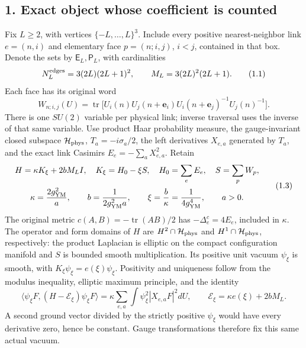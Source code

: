 \documentclass[
  11pt,
]{article}
\begin{document}
\subsection{1. Exact object whose coefficient is
counted}\label{magnetic-part-11-exact-object-whose-coefficient-is-counted}

Fix \(L\ge2\), with vertices \(\{-L,\ldots,L\}^3\). Include every
positive nearest-neighbor link \(e=(n,i)\) and elementary face
\(p=(n;i,j)\), \(i<j\), contained in that box. Denote the sets by
\(\mathsf E_L,\mathsf P_L\), with cardinalities \[
 N_L^{\rm edges}=3(2L)(2L+1)^2,\qquad M_L=3(2L)^2(2L+1).
\tag{1.1}
\] Each face has its original word \[
 W_{n;i,j}(U)=\operatorname{tr}\bigl[
 U_i(n)U_j(n+\mathbf e_i)U_i(n+\mathbf e_j)^{-1}U_j(n)^{-1}\bigr].
\tag{1.2}
\] There is one \(SU(2)\) variable per physical link; inverse traversal
uses the inverse of that same variable. Use product Haar probability
measure, the gauge-invariant closed subspace \(\mathcal H_{\rm phys}\),
\(T_a=-i\sigma_a/2\), the left derivatives \(X_{e,a}\) generated by
\(T_a\), and the exact link Casimirs \(E_e=-\sum_aX_{e,a}^2\). Retain \[
\begin{gathered}
 H=\kappa K_\xi+2bM_LI,
 \quad K_\xi=H_0-\xi S,
 \quad H_0=\sum_eE_e,
 \quad S=\sum_pW_p,\\
 \kappa=\frac{2g_{\rm YM}^2}{a},\qquad
 b=\frac1{2g_{\rm YM}^2a},\qquad
 \xi=\frac b\kappa=\frac1{4g_{\rm YM}^4},\qquad a>0.
\end{gathered}
\tag{1.3}
\] The original metric \(c(A,B)=-\operatorname{tr}(AB)/2\) has
\(-\Delta_e^c=4E_e\), included in \(\kappa\). The operator and form
domains of \(H\) are \(H^2\cap\mathcal H_{\rm phys}\) and
\(H^1\cap\mathcal H_{\rm phys}\), respectively: the product Laplacian is
elliptic on the compact configuration manifold and \(S\) is bounded
smooth multiplication. Its positive unit vacuum \(\psi_\xi\) is smooth,
with \(K_\xi\psi_\xi=e(\xi)\psi_\xi\). Positivity and uniqueness follow
from the modulus inequality, elliptic maximum principle, and the
identity \[
 \langle\psi_\xi F,(H-\mathcal E_\xi)\psi_\xi F\rangle
 =\kappa\sum_{e,a}\int\psi_\xi^2|X_{e,a}F|^2dU,
 \qquad \mathcal E_\xi=\kappa e(\xi)+2bM_L.
\tag{1.4}
\] A second ground vector divided by the strictly positive \(\psi_\xi\)
would have every derivative zero, hence be constant. Gauge
transformations therefore fix this same actual vacuum.
\end{document}

